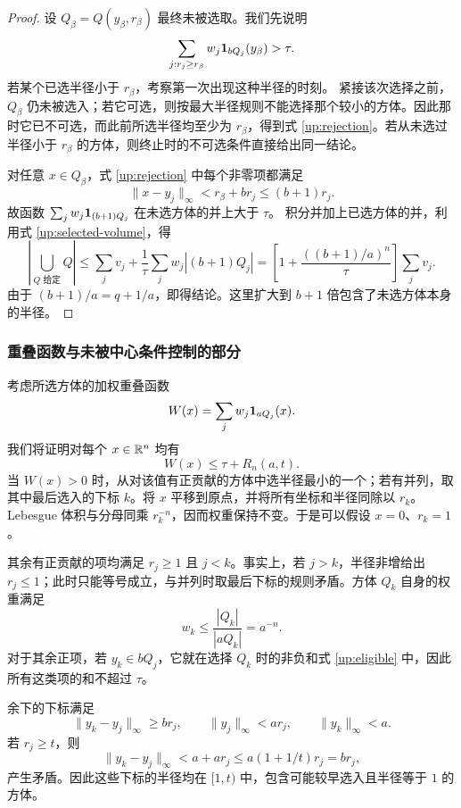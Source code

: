 \begin{proof}
设 $Q_\beta=Q(y_\beta,r_\beta)$ 最终未被选取。我们先说明
\begin{equation}\label{up:rejection}
 \sum_{j:r_j\ge r_\beta}w_j\mathbf{1}_{bQ_j}(y_\beta)>\tau.
\end{equation}
若某个已选半径小于 $r_\beta$，考察第一次出现这种半径的时刻。
紧接该次选择之前，$Q_\beta$ 仍未被选入；若它可选，则按最大半径规则不能选择那个较小的方体。因此那时它已不可选，而此前所选半径均至少为 $r_\beta$，得到式 \eqref{up:rejection}。若从未选过半径小于 $r_\beta$ 的方体，则终止时的不可选条件直接给出同一结论。

对任意 $x\in Q_\beta$，式 \eqref{up:rejection} 中每个非零项都满足
\[
 \|x-y_j\|_\infty<r_\beta+br_j\le(b+1)r_j.
\]
故函数 $\sum_jw_j\mathbf{1}_{(b+1)Q_j}$ 在未选方体的并上大于 $\tau$。
积分并加上已选方体的并，利用式 \eqref{up:selected-volume}，得
\[
 \left|\bigcup_{Q\text{ 给定}}Q\right|
 \le\sum_jv_j+\frac1\tau\sum_jw_j|(b+1)Q_j|
 =\left[1+\frac{((b+1)/a)^n}{\tau}\right]\sum_jv_j.
\]
由于 $(b+1)/a=q+1/a$，即得结论。这里扩大到 $b+1$ 倍包含了未选方体本身的半径。
\end{proof}

\subsubsection{重叠函数与未被中心条件控制的部分}

考虑所选方体的加权重叠函数
\begin{equation}\label{up:W}
 W(x)=\sum_jw_j\mathbf{1}_{aQ_j}(x).
\end{equation}
我们将证明对每个 $x\in\mathbb{R}^n$ 均有
\begin{equation}\label{up:overlap}
 W(x)\le\tau+R_n(a,t).
\end{equation}
当 $W(x)>0$ 时，从对该值有正贡献的方体中选半径最小的一个；若有并列，取其中最后选入的下标 $k$。将 $x$ 平移到原点，并将所有坐标和半径同除以 $r_k$。Lebesgue 体积与分母同乘 $r_k^{-n}$，因而权重保持不变。于是可以假设 $x=0$、$r_k=1$。

其余有正贡献的项均满足 $r_j\ge1$ 且 $j<k$。事实上，若 $j>k$，半径非增给出 $r_j\le1$；此时只能等号成立，与并列时取最后下标的规则矛盾。方体 $Q_k$ 自身的权重满足
\begin{equation}\label{up:self}
 w_k\le\frac{|Q_k|}{|aQ_k|}=a^{-n}.
\end{equation}
对于其余正项，若 $y_k\in bQ_j$，它就在选择 $Q_k$ 时的非负和式 \eqref{up:eligible} 中，因此所有这类项的和不超过 $\tau$。

余下的下标满足
\begin{equation}\label{up:uncontrolled}
 \|y_k-y_j\|_\infty\ge br_j,\qquad
 \|y_j\|_\infty<ar_j,\qquad \|y_k\|_\infty<a.
\end{equation}
若 $r_j\ge t$，则
\[
 \|y_k-y_j\|_\infty<a+ar_j\le a(1+1/t)r_j=br_j,
\]
产生矛盾。因此这些下标的半径均在 $[1,t)$ 中，包含可能较早选入且半径等于 $1$ 的方体。

